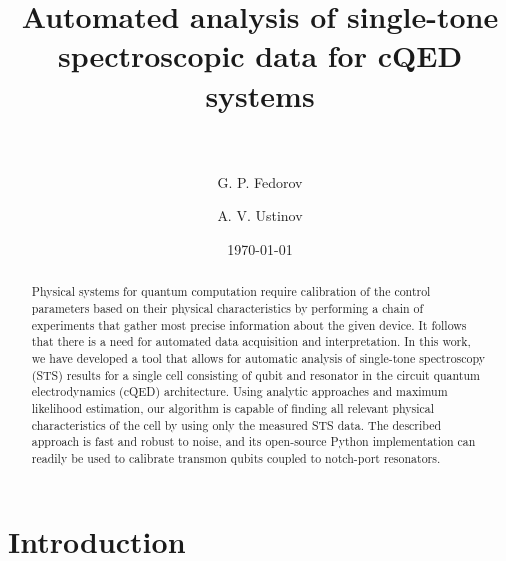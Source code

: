 \documentclass[%
 aip,
 amsmath,amssymb,
 reprint,%
]{revtex4-1}
\begin{document}

\title[Automated analysis of single-tone spectroscopic data for cQED systems]{Automated analysis of single-tone spectroscopic data for cQED systems\\~}

\author{G. P. Fedorov}

%
%
%

\author{A. V. Ustinov}
%
%
%

\date{\today}%

\begin{abstract}
Physical systems for quantum computation require calibration of the control parameters based on their physical characteristics by performing a chain of experiments that gather most precise information about the given device. It follows that there is a need for automated data acquisition and interpretation. In this work, we have developed a tool that allows for automatic analysis of single-tone spectroscopy (STS) results for a single cell consisting of qubit and resonator in the circuit quantum electrodynamics (cQED) architecture. Using analytic approaches and maximum likelihood estimation, our algorithm is capable of finding all relevant physical characteristics of the cell by using only the measured STS data. The described approach is fast and robust to noise, and its open-source Python implementation can readily be used to calibrate transmon qubits coupled to notch-port resonators.
\end{abstract}

\maketitle

 \renewcommand*{\figureautorefname}{Fig.}

\section{Introduction} \label{sec:level1} 
\end{document}

